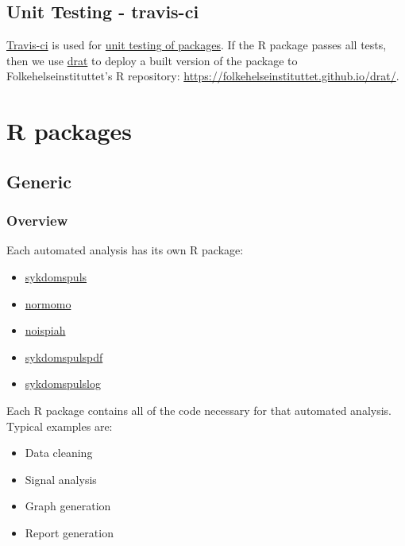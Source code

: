 \documentclass[12pt,]{article}
\providecommand{\tightlist}{%
  \setlength{\itemsep}{0pt}\setlength{\parskip}{0pt}}
\begin{document}
\subsection{Unit Testing - travis-ci}\label{travis}

\href{http://travis-ci.org/folkehelseinstituttet}{Travis-ci} is used for
\href{http://r-pkgs.had.co.nz/check.html\#travis}{unit testing of
packages}. If the R package passes all tests, then we use
\href{https://github.com/eddelbuettel/drat}{drat} to deploy a built
version of the package to Folkehelseinstituttet's R repository:
\url{https://folkehelseinstituttet.github.io/drat/}.

\section{R packages}\label{r-packages}

\subsection{Generic}\label{generic}

\subsubsection{Overview}\label{overview}

Each automated analysis has its own R package:

\begin{itemize}
\tightlist
\item
  \href{https://folkehelseinstituttet.github.io/dashboards_sykdomspuls/}{sykdomspuls}
\item
  \href{https://folkehelseinstituttet.github.io/dashboards_normomo/}{normomo}
\item
  \href{https://folkehelseinstituttet.github.io/dashboards_noispiah/}{noispiah}
\item
  \href{https://folkehelseinstituttet.github.io/dashboards_sykdomspuls_pdf/}{sykdomspulspdf}
\item
  \href{https://folkehelseinstituttet.github.io/dashboards_sykdomspuls_log/}{sykdomspulslog}
\end{itemize}

Each R package contains all of the code necessary for that automated
analysis. Typical examples are:

\begin{itemize}
\tightlist
\item
  Data cleaning
\item
  Signal analysis
\item
  Graph generation
\item
  Report generation
\end{itemize}
\end{document}
